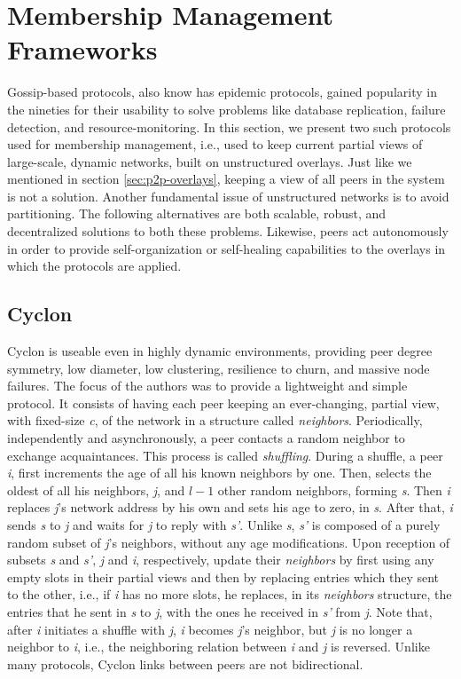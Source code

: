 \documentclass[runningheads]{llncs}
\begin{document}
\section{Membership Management Frameworks}\label{sec:membership-management}

Gossip-based protocols, also know has epidemic protocols, gained popularity in the nineties for their usability to solve problems like database replication, failure detection, and resource-monitoring. In this section, we present two such protocols used for membership management, i.e., used to keep current partial views of large-scale, dynamic networks, built on unstructured overlays. Just like we mentioned in section \ref{sec:p2p-overlays}, keeping a view of all peers in the system is not a solution. Another fundamental issue of unstructured networks is to avoid partitioning. The following alternatives are both scalable, robust, and decentralized solutions to both these problems. Likewise, peers act autonomously in order to provide self-organization or self-healing capabilities to the overlays in which the protocols are applied.

\subsection{Cyclon} Cyclon\cite{cyclon} is useable even in highly dynamic environments, providing peer degree symmetry, low diameter, low clustering, resilience to churn, and massive node failures. The focus of the authors was to provide a lightweight and simple protocol. It consists of having each peer keeping an ever-changing, partial view, with fixed-size \textit{c}, of the network in a structure called \textit{neighbors}. Periodically, independently and asynchronously, a peer contacts a random neighbor to exchange acquaintances. This process is called \textit{shuffling}. During a shuffle, a peer \textit{i}, first increments the age of all his known neighbors by one. Then, selects the oldest of all his neighbors, \textit{j}, and $l-1$ other random neighbors, forming \textit{s}. Then \textit{i} replaces \textit{j}'s network address by his own and sets his age to zero, in \textit{s}. After that, \textit{i} sends \textit{s} to \textit{j} and waits for \textit{j} to reply with \textit{s'}. Unlike \textit{s}, \textit{s'} is composed of a purely random subset of \textit{j}'s neighbors, without any age modifications. Upon reception of subsets \textit{s} and \textit{s'}, \textit{j} and \textit{i}, respectively, update their \textit{neighbors} by first using any empty slots in their partial views and then by replacing entries which they sent to the other, i.e., if \textit{i} has no more slots, he replaces, in its \textit{neighbors} structure, the entries that he sent in \textit{s} to \textit{j}, with the ones he received in \textit{s'} from \textit{j}. Note that, after \textit{i} initiates a shuffle with \textit{j}, \textit{i} becomes \textit{j}'s neighbor, but \textit{j} is no longer a neighbor to \textit{i}, i.e., the neighboring relation between \textit{i} and \textit{j} is reversed. Unlike many protocols, Cyclon links between peers are not bidirectional.
\end{document}
